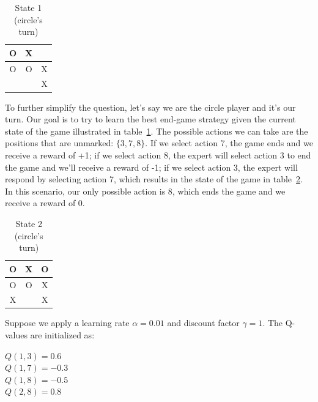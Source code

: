 \begin{table}[H]
\begin{center}
  \begin{tabular}{  c | c | c  }
    O & X &  \\ \hline
    O & O & X \\ \hline
      &   & X \\ 
  \end{tabular}
 \caption{State 1 (circle's turn)}
 \label{table:state1}
\end{center}
\end{table}

To further simplify the question, let's say we are the circle player and it's our turn. Our goal is to try to learn the best end-game strategy given the current state of the game illustrated in table~\ref{table:state1}. The possible actions we can take are the positions that are unmarked: $\big\{ 3, 7, 8 \big\}$. If we select action 7, the game ends and we receive a reward of +1; if we select action 8, the expert will select action 3 to end the game and we'll receive a reward of -1; if we select action 3, the expert will respond by selecting action 7, which results in the state of the game in table~\ref{table:state2}. In this scenario, our only possible action is 8, which ends the game and we receive a reward of 0.

\begin{table}[H]
\begin{center}
  \begin{tabular}{  c | c | c  }
    O & X & O \\ \hline
    O & O & X \\ \hline
    X &   & X \\ 
  \end{tabular}
 \caption{State 2 (circle's turn)}
 \label{table:state2}
\end{center}
\end{table}

Suppose we apply a learning rate $\alpha = 0.01$ and discount factor $\gamma = 1$. The Q-values are initialized as:

\begin{center}
$Q(1, 3) = 0.6$\\
$Q(1, 7) = -0.3$\\
$Q(1, 8) = -0.5$\\
$Q(2, 8) = 0.8$\\
\end{center}

